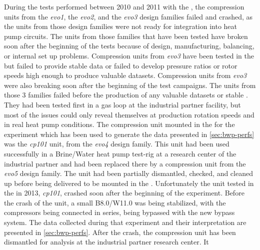 During the tests performed between 2010 and 2011 with the \BWP{}, the
compression units from the \textit{evo1}, the \textit{evo2}, and the
\textit{evo3} design families failed and crashed, as the units from
those design families were not ready for integration into heat pump
circuits. The units from those families that have been tested have
broken soon after the beginning of the tests because of design,
manufacturing, balancing, or internal set up problems. Compression
units from \textit{evo3} have been tested in the \BWP{} but failed to
provide stable data or failed to develop pressure ratios or rotor
speeds high enough to produce valuable datasets. Compression units
from \textit{evo3} were also breaking soon after the beginning of the
test campaigns. The units from those 3 families failed before the
production of any valuable datasets or stable \OP{}. They had been
tested first in a gas loop at the industrial partner facility, but
most of the issues could only reveal themselves at production rotation
speeds and in real heat pump conditions. The compression unit
mounted in the \BWP{} for the experiment which has been used to
generate the data presented in \cref{sec:bwp-perfs} was the
\textit{cp101} unit, from the \textit{evo4} design
family. This unit had been used successfully
in a Brine/Water heat pump test-rig at a research center of the
industrial partner and had been replaced there by a compression unit
from the \textit{evo5} design family. The unit had been partially dismantled,
checked, and cleaned up before being delivered to be mounted in the
\BWP{}. Unfortunately the unit tested in
the \BWP{} in 2013, \textit{cp101}, crashed soon after the beginning
of the experiment. Before the crash of the unit, a small B8.0/W11.0
was being stabilized, with the compressors being connected in series,
being bypassed with the new bypass system. The data collected during
that experiment and their interpretation are presented in
\cref{sec:bwp-perfs}. After the crash, the compression unit has been
dismantled for analysis at the industrial partner research center. It
